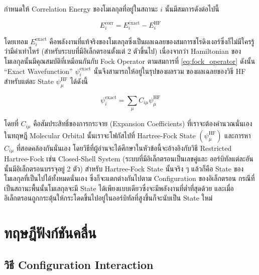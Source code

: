 กำหนดให้ Correlation Energy ของโมเลกุลที่อยู่ในสถานะ $i$ นั้นมีสมการดังต่อไปนี้

\begin{equation}
  \label{eq:Correlation_Energy}
  E^{\text{corr}}_{i}
  =
  E^{\text{exact}}_{i} - E^{\text{HF}}_{i}
\end{equation}

\noindent โดยเทอม $E^{\text{exact}}_{i}$ คือพลังงานที่แท้จริงของโมเลกุลซึ่งเป็นผลเฉลยของสมการชโรดิงเงอร์ซึ่งก็ไม่มีใครรู้ว่ามีค่าเท่าไหร่
(สำหรับระบบที่มีอิเล็กตรอนตั้งแต่ 2 ตัวขึ้นไป) เนื่องจากว่า Hamiltonian ของโมเลกุลนั้นมีคุณสมบัติที่เหมือนกันกับ Fock Operator ตามสมการที่
\eqref{eq:fock_operator} ดังนั้น \enquote{Exact Wavefunction} $\psi^{\text{exact}}_{i}$ นั้นจึงสามารถให้อยู่ในรุปของผลรวม%
ของผลเฉลยของวิธี HF สำหรับแต่ละ State $\psi^{\text{HF}}_{\mu}$ ได้ดังนี้

\begin{equation}
  \label{eq:Exact_Wavefunction}
  \psi^{\text{exact}}_{i}
  =
  \sum_{\mu} C_{i \mu} \psi^{\text{HF}}_{\mu}
\end{equation}

\noindent โดยที่ $C_{i \mu}$ คือสัมประสิทธิ์ของการกระจาย (Expansion Coefficients) ที่เราจะต้องคำนวณนั่นเอง ในทฤษฎี Molecular
Orbital นั้นเราจะโฟกัสไปที่ Hartree-Fock State $(\psi^{\text{HF}}_{\mu})$ และการหา $C_{i \mu}$ ที่สอดคล้องกันนั่นเอง
โดยวิธีที่ผู้อ่านจะได้ศึกษาในหัวข้อนี้จะอ้างอิงกับวิธี Restricted Hartree-Fock เช่น Closed-Shell System (ระบบที่มีอิเล็กตรอนเป็นเลขคู่และ%
ออร์บิทัลแต่ละอันนั้นมีอิเล็กตรอนบรรจุอยู่ 2 ตัว) สำหรับ Hartree-Fock State นั้นจริง ๆ แล้วก็คือ State ของโมเลกุลที่เป็นไปได้ทั้งหมดนั่นเอง%
ซึ่งก็จะแตกต่างกันไปตาม Configuration ของอิเล็กตรอน กรณีที่เป็นสถานะพื้นนั้นโมเลกุลจะมี State ได้เพียงแบบเดียวซึ่งจะมีพลังงานที่ต่ำที่สุดด้วย%
และเมื่ออิเล็กตรอนถูกกระตุ้นให้กระโดดขึ้นไปอยู่ในออร์บิทัลที่สูงขึ้นก็จะนับเป็น State ใหม่

\section{ทฤษฎีฟังก์ชันคลื่น}

\subsection{วิธี Configuration Interaction}

